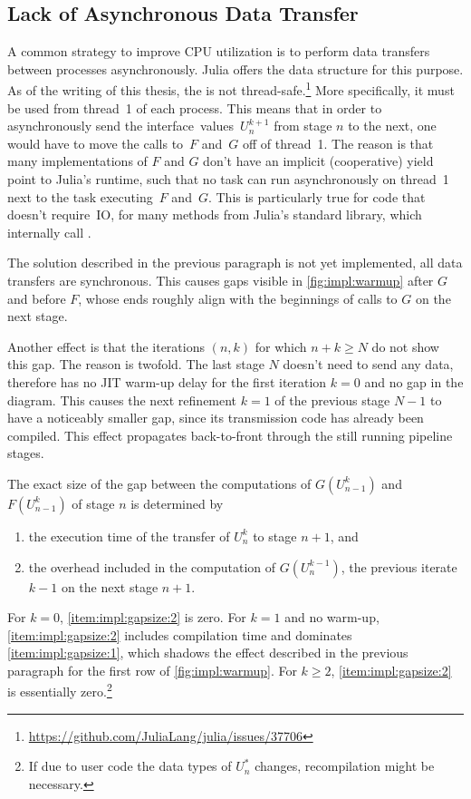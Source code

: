 \subsection{Lack of Asynchronous Data Transfer}

A common strategy to improve CPU utilization is to perform data transfers between processes asynchronously.
Julia offers the  data structure for this purpose.
As of the writing of this thesis,
the  is not thread-safe.\footnote{\url{https://github.com/JuliaLang/julia/issues/37706}}
More specifically, it must be used from thread~1 of each process.
This means that in order to asynchronously send the interface~values~$U_n^{k+1}$ from stage $n$ to the next,
one would have to move the calls to~$F$ and~$G$ off of thread~1.
The reason is that many implementations of $F$ and $G$ don't have an implicit (cooperative) yield point to Julia's runtime,
such that no task can run asynchronously on thread~1 next to the task executing~$F$ and~$G$.
This is particularly true for code that doesn't require~\ac{IO},
\eg for many methods from Julia's  standard library,
which internally call .

The solution described in the previous paragraph is not yet implemented,
\ie all data transfers are synchronous.
This causes gaps visible in \autoref{fig:impl:warmup} after $G$ and before $F$,
whose ends roughly align with the beginnings of calls to $G$ on the next stage.

Another effect is that the iterations $(n,k)$ for which $n+k \geq N$ do not show this gap.
The reason is twofold.
The last stage $N$ doesn't need to send any data, therefore has no \ac{JIT} warm-up delay for the first iteration $k=0$ and no gap in the diagram.
This causes the next refinement $k=1$ of the previous stage $N-1$ to have a noticeably smaller gap,
since its transmission code has already been compiled.
This effect propagates back-to-front through the still running pipeline stages.

The exact size of the gap between the computations of $G(U_{n-1}^k)$ and $F(U_{n-1}^k)$ of stage $n$ is determined by
\begin{enumerate}
  \item\label{item:impl:gapsize:1}
    the execution time of the transfer of $U_n^k$ to stage $n+1$, and
  \item\label{item:impl:gapsize:2}
    the overhead included in the computation of $G(U_n^{k-1})$,
    \ie the previous iterate $k-1$ on the next stage $n+1$.
\end{enumerate}
For $k=0$, \ref{item:impl:gapsize:2} is zero.
For $k=1$ and no warm-up, \ref{item:impl:gapsize:2} includes compilation time and dominates \ref{item:impl:gapsize:1},
which shadows the effect described in the previous paragraph for the first row of \autoref{fig:impl:warmup}.
For $k\geq 2$, \ref{item:impl:gapsize:2} is essentially zero.\footnote{%
  If due to user code the data types of $U_n^*$ changes, recompilation might be necessary.
}

